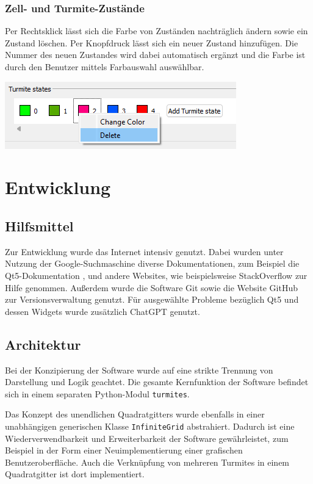 \subsubsection{Zell- und Turmite-Zustände}
Per Rechtsklick lässt sich die Farbe von Zuständen nachträglich ändern sowie ein Zustand löschen. Per Knopfdruck lässt sich ein neuer Zustand hinzufügen. Die Nummer des neuen Zustandes wird dabei automatisch ergänzt und die Farbe ist durch den Benutzer mittels Farbauswahl auswählbar.

\includegraphics[width=\textwidth]{context_menu_states.png}

\section{Entwicklung}
\subsection{Hilfsmittel}
Zur Entwicklung wurde das Internet intensiv genutzt. Dabei wurden unter Nutzung der Google-Suchmaschine \cite{google} diverse Dokumentationen, zum Beispiel die Qt5-Dokumentation \cite{qt5}, und andere Websites, wie beispielsweise StackOverflow \cite{stackoverflow} zur Hilfe genommen. Außerdem wurde die Software Git \cite{git} sowie die Website GitHub \cite{github} zur Versionsverwaltung genutzt. Für ausgewählte Probleme bezüglich Qt5 und dessen Widgets wurde zusätzlich ChatGPT \cite{chatgpt} genutzt.

\subsection{Architektur}
Bei der Konzipierung der Software wurde auf eine strikte Trennung von Darstellung und Logik geachtet. Die gesamte Kernfunktion der Software befindet sich in einem separaten Python-Modul \texttt{turmites}.

Das Konzept des unendlichen Quadratgitters wurde ebenfalls in einer unabhängigen generischen Klasse \texttt{InfiniteGrid} abstrahiert. Dadurch ist eine Wiederverwendbarkeit und Erweiterbarkeit der Software gewährleistet, zum Beispiel in der Form einer Neuimplementierung einer grafischen Benutzeroberfläche. Auch die Verknüpfung von mehreren Turmites in einem Quadratgitter ist dort implementiert. 

